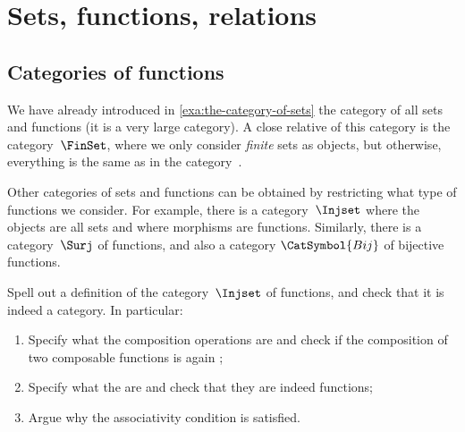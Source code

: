 
\section{Sets, functions, relations}


\subsection{Categories of functions}

We have already introduced in \cref{exa:the-category-of-sets} the category of all sets and functions (it is a very large category).
A close relative of this category is the category~$\FinSet$, where we only consider \emph{finite} sets as objects, but otherwise, everything is the same as in the category~\Set.

Other categories of sets and functions can be obtained by restricting what type of functions we consider.
For example, there is a category~$\Injset$ where the objects are all sets and where morphisms are  functions.
Similarly, there is a category~$\Surj$ of  functions, and also a category $\CatSymbol{Bij}$ of bijective functions.

\begin{exercise}
    Spell out a definition of the category~$\Injset$ of  functions, and check that it is indeed a category.
    In particular:
    \begin{enumerate}
        \item Specify what the composition operations are and check if the composition of two composable  functions is again ;
        \item Specify what the  are and check that they are indeed  functions;
        \item Argue why the associativity condition is satisfied.
    \end{enumerate}
\end{exercise}

